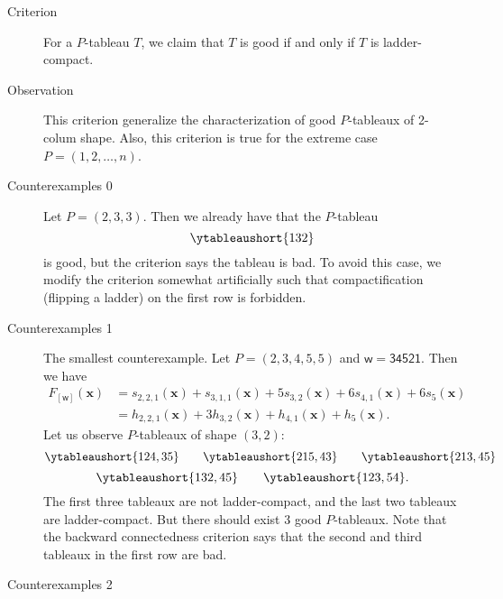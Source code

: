 \documentclass[12pt,a4paper,reqno]{amsart}
\theoremstyle{definition}
\theoremstyle{remark}
\newcommand\xx{\mathbf{x}}
\newcommand\ww{\mathsf{w}}
\begin{document}
\begin{description}
  \item[Criterion] For a \( P \)-tableau \( T \), we claim that \( T \) is good if and only if
  \( T \) is ladder-compact.
  \item[Observation] This criterion generalize the characterization of good \( P \)-tableaux of
  2-colum shape. Also, this criterion is true for the extreme case \( P=(1,2,\dots,n) \).
  \item[Counterexamples 0] Let \( P=(2,3,3) \). Then we already have that the \( P \)-tableau
  \[
    \ytableaushort{132}
  \]
  is good, but the criterion says the tableau is bad. To avoid this case, we modify the criterion
  somewhat artificially such that compactification (flipping a ladder) on the first row is forbidden.
  \item[Counterexamples 1] The smallest counterexample. Let \( P=(2,3,4,5,5) \) and
  \( \ww=\mathsf{34521} \). Then we have
  \begin{align*}
    F_{[\ww]}(\xx)
      &= s_{2,2,1}(\xx) + s_{3,1,1}(\xx) + 5 s_{3,2}(\xx) + 6 s_{4,1}(\xx) + 6 s_5(\xx) \\
      &= h_{2,2,1}(\xx) + 3 h_{3,2}(\xx) + h_{4,1}(\xx) + h_5(\xx).
  \end{align*}
  Let us observe \( P \)-tableaux of shape \( (3,2) \):
  \[
    \ytableaushort{124,35} \qquad \ytableaushort{215,43} \qquad \ytableaushort{213,45}
  \]
  \[
    \ytableaushort{132,45} \qquad \ytableaushort{123,54}.
  \]
  The first three tableaux are not ladder-compact, and the last two tableaux are ladder-compact.
  But there should exist 3 good \( P \)-tableaux.
  Note that the backward connectedness criterion says that the second and third tableaux in the
  first row are bad.
  \item[Counterexamples 2] 
\end{description}
\end{document}

